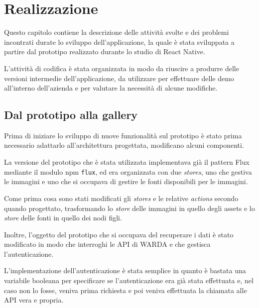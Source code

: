 
\chapter{Realizzazione}
\label{cap:realizzazione}

Questo capitolo contiene la descrizione delle attività svolte e dei problemi incontrati durate lo sviluppo dell'applicazione, la quale è stata sviluppata a partire dal prototipo realizzato durante lo studio di React Native.

L'attività di codifica è stata organizzata in modo da riuscire a produrre delle versioni intermedie dell'applicazione, da utilizzare per effettuare delle demo all'interno dell'azienda e per valutare la necessità di alcune modifiche.

\section{Dal prototipo alla gallery}

Prima di iniziare lo sviluppo di nuove funzionalità sul prototipo è stato prima necessario adattarlo all'architettura progettata, modificano alcuni componenti.

La versione del prototipo che è stata utilizzata implementava già il pattern Flux mediante il modulo npm \texttt{flux}, ed era organizzata con due \textit{stores}, uno che gestiva le immagini e uno che si occupava di gestire le fonti disponibili per le immagini.

Come prima cosa sono stati modificati gli \textit{stores} e le relative \textit{actions} secondo quando progettato, trasformando lo \textit{store} delle immagini in quello degli assets e lo \textit{store} delle fonti in quello dei nodi figli.

Inoltre, l'oggetto del prototipo che si occupava del recuperare i dati è stato modificato in modo che interroghi le API di WARDA e che gestisca l'autenticazione.

L'implementazione dell'autenticazione è stata semplice in quanto è bastata una variabile booleana per specificare se l'autenticazione era già stata effettuata e, nel caso non lo fosse, veniva prima richiesta e poi veniva effettuata la chiamata alle API vera e propria.

